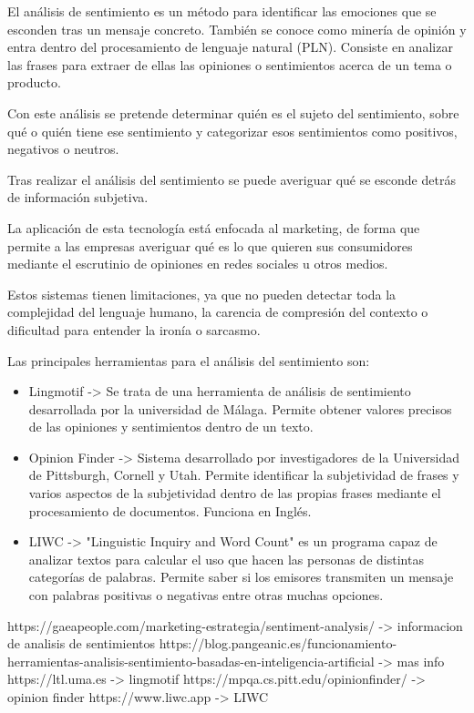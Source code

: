 El análisis de sentimiento es un método para identificar las emociones que se esconden tras un mensaje concreto. También se conoce como minería de opinión y entra dentro del procesamiento de lenguaje natural (PLN). Consiste en analizar las frases para extraer de ellas las opiniones o sentimientos acerca de un tema o producto.

Con este análisis se pretende determinar quién es el sujeto del sentimiento, sobre qué o quién tiene ese sentimiento y categorizar esos sentimientos como positivos, negativos o neutros.

Tras realizar el análisis del sentimiento se puede averiguar qué se esconde detrás de información subjetiva.

La aplicación de esta tecnología está enfocada al marketing, de forma que permite a las empresas averiguar qué es lo que quieren sus consumidores mediante el escrutinio de opiniones en redes sociales u otros medios.

Estos sistemas tienen limitaciones, ya que no pueden detectar toda la complejidad del lenguaje humano, la carencia de compresión del contexto o dificultad para entender la ironía o sarcasmo.

Las principales herramientas para el análisis del sentimiento son:
\begin{itemize}
	\item Lingmotif -> Se trata de una herramienta de análisis de sentimiento desarrollada por la universidad de Málaga. Permite obtener valores precisos de las opiniones y sentimientos dentro de un texto.
	\item Opinion Finder -> Sistema desarrollado por investigadores de la Universidad de Pittsburgh, Cornell y Utah. Permite identificar la subjetividad de frases y varios aspectos de la subjetividad dentro de las propias frases mediante el procesamiento de documentos. Funciona en Inglés.
	\item LIWC -> "Linguistic Inquiry and Word Count" es un programa capaz de analizar textos para calcular el uso que hacen las personas de distintas categorías de palabras. Permite saber si los emisores transmiten un mensaje con palabras positivas o negativas entre otras muchas opciones.
\end{itemize}



https://gaeapeople.com/marketing-estrategia/sentiment-analysis/ -> informacion de analisis de sentimientos
https://blog.pangeanic.es/funcionamiento-herramientas-analisis-sentimiento-basadas-en-inteligencia-artificial -> mas info
https://ltl.uma.es -> lingmotif
https://mpqa.cs.pitt.edu/opinionfinder/ -> opinion finder
https://www.liwc.app -> LIWC